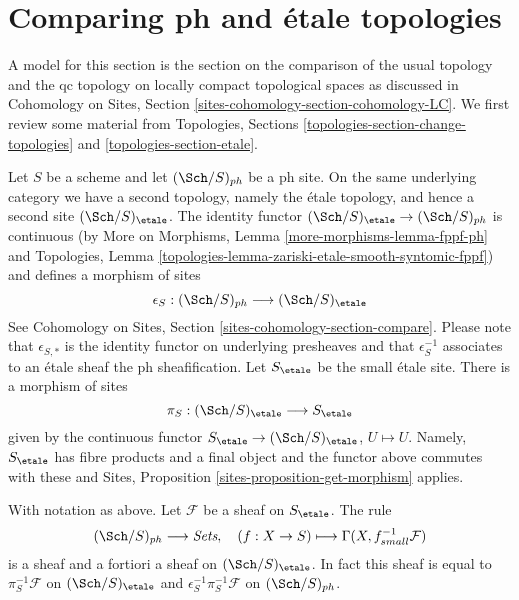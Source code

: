 \section{Comparing ph and \'etale topologies}
\label{section-ph-etale}

\noindent
A model for this section is the section on the comparison of the
usual topology and the qc topology on locally compact topological
spaces as discussed in Cohomology on Sites, Section
\ref{sites-cohomology-section-cohomology-LC}.
We first review some material from
Topologies, Sections
\ref{topologies-section-change-topologies} and
\ref{topologies-section-etale}.

\medskip\noindent
Let $S$ be a scheme and let $(\Sch/S)_{ph}$ be a ph site.
On the same underlying category we have a second topology,
namely the \'etale topology, and hence a second site
$(\Sch/S)_\etale$. The identity functor
$(\Sch/S)_\etale \to (\Sch/S)_{ph}$ is continuous
(by More on Morphisms, Lemma \ref{more-morphisms-lemma-fppf-ph}
and Topologies, Lemma
\ref{topologies-lemma-zariski-etale-smooth-syntomic-fppf})
and defines a morphism of sites
$$
\epsilon_S : (\Sch/S)_{ph} \longrightarrow (\Sch/S)_\etale
$$
See Cohomology on Sites, Section \ref{sites-cohomology-section-compare}.
Please note that $\epsilon_{S, *}$ is the identity functor on underlying
presheaves and that $\epsilon_S^{-1}$ associates to an \'etale sheaf the
ph sheafification.
Let $S_\etale$ be the small \'etale site.
There is a morphism of sites
$$
\pi_S : (\Sch/S)_\etale \longrightarrow S_\etale
$$
given by the continuous functor
$S_\etale \to (\Sch/S)_\etale$, $U \mapsto U$.
Namely, $S_\etale$ has fibre products and a final object and the
functor above commutes with these and
Sites, Proposition \ref{sites-proposition-get-morphism} applies.

\begin{lemma}
\label{lemma-describe-pullback-pi-ph}
With notation as above.
Let $\mathcal{F}$ be a sheaf on $S_\etale$. The rule
$$
(\Sch/S)_{ph} \longrightarrow \textit{Sets},\quad
(f : X \to S) \longmapsto \Gamma(X, f_{small}^{-1}\mathcal{F})
$$
is a sheaf and a fortiori a sheaf on $(\Sch/S)_\etale$.
In fact this sheaf is equal to
$\pi_S^{-1}\mathcal{F}$ on $(\Sch/S)_\etale$ and
$\epsilon_S^{-1}\pi_S^{-1}\mathcal{F}$ on $(\Sch/S)_{ph}$.
\end{lemma}

